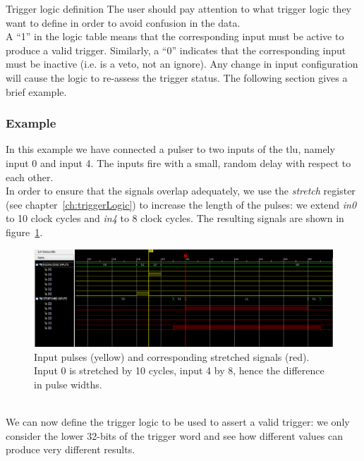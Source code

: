 \begin{alertinfo}{Trigger logic definition}
    The user should pay attention to what trigger logic they want to define in order to avoid confusion in the data.\\
    A ``1'' in the logic table means that the corresponding input must be active to produce a valid trigger. Similarly, a ``0'' indicates that the corresponding input must be inactive (i.e. is a veto, not an ignore). Any change in input configuration will cause the logic to re-assess the trigger status. The following section gives a brief example.\\
\end{alertinfo}

\subsubsection{Example}
In this example we have connected a pulser to two inputs of the \gls{tlu}, namely input 0 and input 4. The inputs fire with a small, random delay with respect to each other.\\
In order to ensure that the signals overlap adequately, we use the \emph{stretch} register (see chapter~\ref{ch:triggerLogic}) to increase the length of the pulses: we extend \emph{in0} to 10 clock cycles and \emph{in4} to 8 clock cycles. The resulting signals are shown in figure~\ref{Fig:exampleExtendedTriggers}.
\begin{figure}
  \centering
  \includegraphics[width=.90\textwidth]{./Images/Initial.png}
  \caption{Input pulses (yellow) and corresponding stretched signals (red). Input 0 is stretched by 10 cycles, input 4 by 8, hence the difference in pulse widths.}
  \label{Fig:exampleExtendedTriggers}
\end{figure}\\
We can now define the trigger logic to be used to assert a valid trigger: we only consider the lower 32-bits of the trigger word and see how different values can produce very different results.
